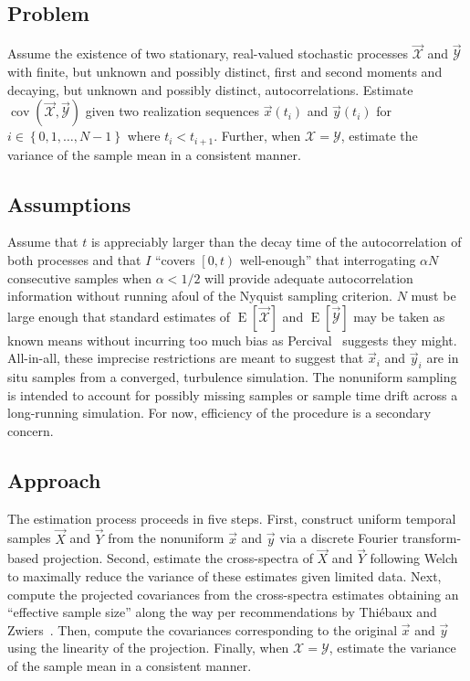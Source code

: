 \documentclass[letterpaper,11pt,nointlimits,reqno]{amsart}
\DeclareMathOperator{\cov}{cov}
\begin{document}
\subsection*{Problem}

Assume the existence of two stationary, real-valued stochastic processes
$\vec{\mathscr{X}}$ and $\vec{\mathscr{Y}}$ with finite, but unknown and
possibly distinct, first and second moments and decaying, but unknown and
possibly distinct, autocorrelations.  Estimate
$\cov\left(\vec{\mathscr{X}},\vec{\mathscr{Y}}\right)$ given two realization
sequences $\vec{x}\left(t_i\right)$ and $\vec{y}\left(t_i\right)$ for
$i\in\left\{0,1,\dots,N-1\right\}$ where $t_i < t_{i+1}$.  Further, when
$\mathscr{X}=\mathscr{Y}$, estimate the variance of the sample mean in a
consistent manner.

\subsection*{Assumptions}

Assume that $t$ is appreciably larger than the decay time of the
autocorrelation of both processes and that $I$ ``covers $\left[0,t\right)$
well-enough'' that interrogating $\alpha N$ consecutive samples when
$\alpha<1/2$ will provide adequate autocorrelation information without running
afoul of the Nyquist sampling criterion.  $N$ must be large enough that
standard estimates of $\operatorname{E}\left[\vec{\mathscr{X}}\right]$ and
$\operatorname{E}\left[\vec{\mathscr{Y}}\right]$ may be taken as known means
without incurring too much bias as Percival~\cite{Percival1993Three} suggests
they might.  All-in-all, these imprecise restrictions are meant to suggest that
$\vec{x}_i$ and $\vec{y}_i$ are in situ samples from a converged, turbulence
simulation.  The nonuniform sampling is intended to account for possibly
missing samples or sample time drift across a long-running simulation.  For
now, efficiency of the procedure is a secondary concern.

\subsection*{Approach}

The estimation process proceeds in five steps.  First, construct uniform
temporal samples $\vec{X}$ and $\vec{Y}$ from the nonuniform $\vec{x}$ and
$\vec{y}$ via a discrete Fourier transform-based projection.  Second, estimate
the cross-spectra of $\vec{X}$ and $\vec{Y}$ following
Welch~\cite{Welch1967Use} to maximally reduce the variance of these estimates
given limited data.  Next, compute the projected covariances from the
cross-spectra estimates obtaining an ``effective sample size'' along the way
per recommendations by Thi\'{e}baux and
Zwiers~\cite{Thiebaux1984Interpretation}.  Then, compute the covariances
corresponding to the original $\vec{x}$ and $\vec{y}$ using the linearity of
the projection.  Finally, when $\mathscr{X}=\mathscr{Y}$, estimate the variance
of the sample mean in a consistent manner.
\end{document}
